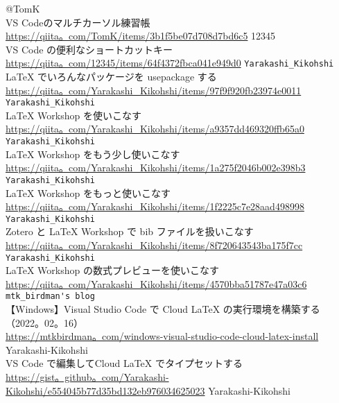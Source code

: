 \documentclass{ltjsarticle}
\begin{document}
\begin{thebibliography}{999}
  @TomK\\
  VS Codeのマルチカーソル練習帳\\
  \url{https://qiita。com/TomK/items/3b1f5be07d708d7bd6c5}
  12345\\
  VS Code の便利なショートカットキー\\
  \url{https://qiita。com/12345/items/64f4372fbca041e949d0}
  \verb|Yarakashi_Kikohshi|\\
  LaTeX でいろんなパッケージを usepackage する\\
  \url{https://qiita。com/Yarakashi_Kikohshi/items/97f9f920fb23974e0011}
  \verb|Yarakashi_Kikohshi|\\
  LaTeX Workshop を使いこなす\\
  \url{https://qiita。com/Yarakashi_Kikohshi/items/a9357dd469320ffb65a0}
  \verb|Yarakashi_Kikohshi|\\
  LaTeX Workshop をもう少し使いこなす\\
  \url{https://qiita。com/Yarakashi_Kikohshi/items/1a275f2046b002e398b3}
  \verb|Yarakashi_Kikohshi|\\
  LaTeX Workshop をもっと使いこなす\\
  \url{https://qiita。com/Yarakashi_Kikohshi/items/1f2225c7e28aad498998}
  \verb|Yarakashi_Kikohshi|\\
  Zotero と LaTeX Workshop で bib ファイルを扱いこなす\\
  \url{https://qiita。com/Yarakashi_Kikohshi/items/8f720643543ba175f7cc}
  \verb|Yarakashi_Kikohshi|\\
  LaTeX Workshop の数式プレビューを使いこなす\\
  \url{https://qiita。com/Yarakashi_Kikohshi/items/4570bba51787e47a03c6}
  \verb|mtk_birdman's blog|\\
  【Windows】Visual Studio Code で Cloud LaTeX の実行環境を構築する（2022。02。16）\\
  \url{https://mtkbirdman。com/windows-visual-studio-code-cloud-latex-install}
  Yarakashi-Kikohshi\\
  VS Code で編集してCloud LaTeX でタイプセットする\\
  \url{https://gist。github。com/Yarakashi-Kikohshi/e554045b77d35bd132eb976034625023}
  Yarakashi-Kikohshi\\

\end{thebibliography}
\end{document}
